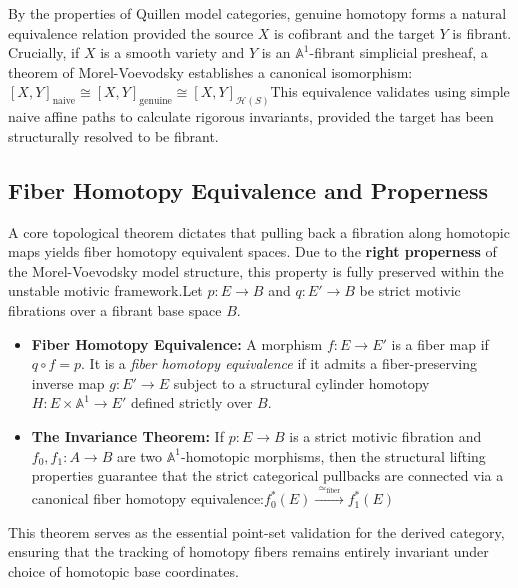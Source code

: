 \documentclass[11pt,oneside]{article}
\begin{document}
By the properties of Quillen model categories, genuine homotopy forms a natural equivalence relation provided the source $X$ is cofibrant and the target $Y$ is fibrant. Crucially, if $X$ is a smooth variety and $Y$ is an $\mathbb{A}^1$-fibrant simplicial presheaf, a theorem of Morel-Voevodsky establishes a canonical isomorphism:\([X,Y]_{\text{naive}}\cong [X,Y]_{\text{genuine}}\cong [X,Y]_{\mathcal{H}(S)}\)This equivalence validates using simple naive affine paths to calculate rigorous invariants, provided the target has been structurally resolved to be fibrant.\subsection{Fiber Homotopy Equivalence and Properness}A core topological theorem dictates that pulling back a fibration along homotopic maps yields fiber homotopy equivalent spaces. Due to the \textbf{right properness} of the Morel-Voevodsky model structure, this property is fully preserved within the unstable motivic framework.Let $p: E \to B$ and $q: E' \to B$ be strict motivic fibrations over a fibrant base space $B$.\begin{itemize}\item \textbf{Fiber Homotopy Equivalence:} A morphism $f: E \to E'$ is a fiber map if $q \circ f = p$. It is a \emph{fiber homotopy equivalence} if it admits a fiber-preserving inverse map $g: E' \to E$ subject to a structural cylinder homotopy $H: E \times \mathbb{A}^1 \to E'$ defined strictly over $B$.\item \textbf{The Invariance Theorem:} If $p: E \to B$ is a strict motivic fibration and $f_0, f_1: A \to B$ are two $\mathbb{A}^1$-homotopic morphisms, then the structural lifting properties guarantee that the strict categorical pullbacks are connected via a canonical fiber homotopy equivalence:\(f_{0}^{*}(E)\xrightarrow{\,\,\simeq _{\text{fiber}}\,\,}f_{1}^{*}(E)\)\end{itemize}This theorem serves as the essential point-set validation for the derived category, ensuring that the tracking of homotopy fibers remains entirely invariant under choice of homotopic base coordinates.
\end{document}
